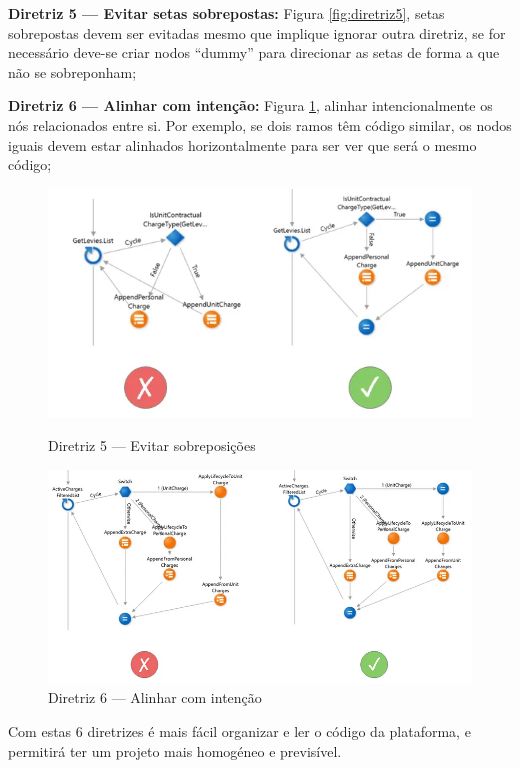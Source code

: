     \textbf{Diretriz 5 — Evitar setas sobrepostas:} Figura \ref{fig:diretriz5}, setas sobrepostas devem ser evitadas mesmo que implique ignorar outra diretriz, se for necessário deve-se criar nodos ``dummy'' para direcionar as setas de forma a que não se sobreponham;

    \textbf{Diretriz 6 — Alinhar com intenção:} Figura \ref{fig:diretriz6}, alinhar intencionalmente os nós relacionados entre si. Por exemplo, se dois ramos têm código similar, os nodos iguais devem estar alinhados horizontalmente para ser ver que será o mesmo código;

    \begin{figure}[htbp]
        \centering
        \begin{minipage}{.5\textwidth}
            \centering
            \includegraphics[scale=0.37]{imgs/diretrizes/5.png}
            \caption{Diretriz 5 — Evitar sobreposições}\label{fig:diretriz5}
        \end{minipage}%
        \begin{minipage}{.5\textwidth}
            \centering
            \includegraphics[scale=0.30]{imgs/diretrizes/6.png}
            \caption{Diretriz 6 — Alinhar com intenção}\label{fig:diretriz6}
        \end{minipage}
    \end{figure}

    Com estas 6 diretrizes é mais fácil organizar e ler o código da plataforma, e permitirá ter um projeto mais homogéneo e previsível\cite{outsystems-style-guide}.



